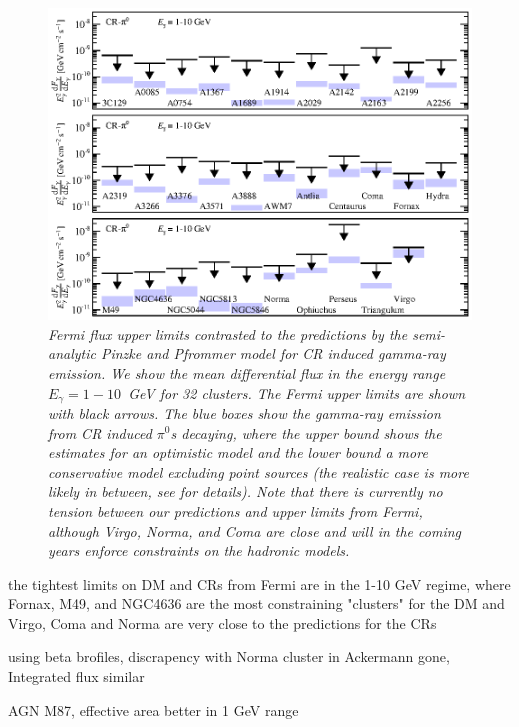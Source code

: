 \documentclass[10pt,aps,pra,reprint,amsmath,amsfonts,amssymb,showpacs]{revtex4-1}
\begin{document}
\begin{figure}
\begin{minipage}{2.0\columnwidth}
  \includegraphics[width=0.99\columnwidth]{figures/Fermi.comp.CR.diff.eps}
  \caption{\it Fermi flux upper limits contrasted to the predictions
    by the semi-analytic Pinzke and Pfrommer model for CR induced
    gamma-ray emission. We show the mean differential flux in the
    energy range $E_\gamma=1-10$~GeV for 32 clusters. The Fermi upper
    limits are shown with black arrows. The blue boxes show the
    gamma-ray emission from CR induced $\pi^0$\:s decaying, where the
    upper bound shows the estimates for an optimistic model and the
    lower bound a more conservative model excluding point sources (the
    realistic case is more likely in between, see
    \cite{2010MNRAS.409..449P} for details). Note that there is
    currently no tension between our predictions and upper limits from
    Fermi, although Virgo, Norma, and Coma are close and will in the
    coming years enforce constraints on the hadronic models.}
 \label{fig15}
\end{minipage}
\end{figure}

the tightest limits on DM and CRs from Fermi are in the 1-10 GeV
 regime, where Fornax, M49, and NGC4636 are the most constraining
 "clusters" for the DM and Virgo, Coma and Norma are very close to the
 predictions for the CRs

using beta brofiles, discrapency with Norma cluster in Ackermann gone,
Integrated flux similar

AGN M87, effective area better in 1 GeV range
\end{document}
